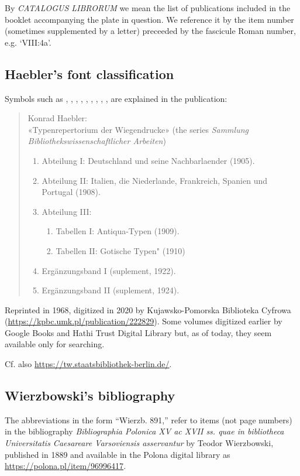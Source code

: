 \documentclass[12pt]{article}
\begin{document}
By \textit{CATALOGUS LIBRORUM} we mean the list of publications
included in the booklet accompanying the plate in question. We
reference it by the item number (sometimes supplemented by a letter)
preceeded by the fascicule Roman number, e.g. `VIII:4a'.


\subsection{Haebler's font classification}
\label{sec:haebl-font-class}


Symbols such as , , , , ,
, , , ,  are explained in the
publication:

\begin{quote}
  Konrad Haebler:\\ «Typenrepertorium der Wiegendrucke» (the series
  \textit{Sammlung Bibliothekswissenschaftlicher Arbeiten})
  \begin{enumerate}
  \item Abteilung I: Deutschland und seine Nachbarlaender (1905).
  \item Abteilung II: Italien, die Niederlande, Frankreich, Spanien und Portugal (1908).
  \item Abteilung III:
    \begin{enumerate}
    \item Tabellen I: Antiqua-Typen (1909).
    \item Tabellen II: Gotische Typen" (1910)
    \end{enumerate}
  \item Ergänzungsband I (suplement, 1922).
  \item Ergänzungsband II (suplement, 1924).
  \end{enumerate}
\end{quote}
Reprinted in 1968, digitized in 2020 by Kujawsko-Pomorska Biblioteka
Cyfrowa (\url{https://kpbc.umk.pl/publication/222829}). Some volumes
digitized earlier by Google Books and Hathi Trust Digital Library but,
as of today, they seem available only for searching.

\noindent
Cf. also \url{https://tw.staatsbibliothek-berlin.de/}.

\subsection{Wierzbowski's bibliography}
\label{sec:wierzb-bibl}

The abbreviations in the form ``Wierzb. 891,'' refer to items (not
page numbers) in the bibliography \textit{Bibliographia Polonica XV ac
  XVII ss. quae in bibliotheca Universitatis Caesareare Varsoviensis
  asservantur} by Teodor Wierzbowski, published in 1889 and available
in the Polona digital library as
\url{https://polona.pl/item/96996417}.
\end{document}
